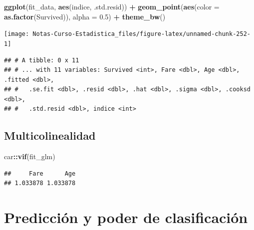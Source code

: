 \documentclass[
  12pt,
]{book}
\newenvironment{Shaded}{\begin{snugshade}}{\end{snugshade}}
\newcommand{\DataTypeTok}[1]{\textcolor[rgb]{0.13,0.29,0.53}{#1}}
\newcommand{\DecValTok}[1]{\textcolor[rgb]{0.00,0.00,0.81}{#1}}
\newcommand{\FloatTok}[1]{\textcolor[rgb]{0.00,0.00,0.81}{#1}}
\newcommand{\KeywordTok}[1]{\textcolor[rgb]{0.13,0.29,0.53}{\textbf{#1}}}
\newcommand{\NormalTok}[1]{#1}
\newcommand{\OperatorTok}[1]{\textcolor[rgb]{0.81,0.36,0.00}{\textbf{#1}}}
\newcommand{\StringTok}[1]{\textcolor[rgb]{0.31,0.60,0.02}{#1}}
\theoremstyle{definition}
\theoremstyle{definition}
\theoremstyle{definition}
\theoremstyle{remark}
\begin{document}
\begin{Shaded}
\begin{Highlighting}[]
\KeywordTok{ggplot}\NormalTok{(fit_data, }\KeywordTok{aes}\NormalTok{(indice, .std.resid)) }\OperatorTok{+}\StringTok{ }\KeywordTok{geom_point}\NormalTok{(}\KeywordTok{aes}\NormalTok{(}\DataTypeTok{color =} \KeywordTok{as.factor}\NormalTok{(Survived)), }
    \DataTypeTok{alpha =} \FloatTok{0.5}\NormalTok{) }\OperatorTok{+}\StringTok{ }\KeywordTok{theme_bw}\NormalTok{()}
\end{Highlighting}
\end{Shaded}

\begin{center}\texttt{[image: Notas-Curso-Estadistica\_files/figure-latex/unnamed-chunk-252-1]} \end{center}

\begin{Shaded}
\end{Shaded}

\begin{verbatim}
## # A tibble: 0 x 11
## # ... with 11 variables: Survived <int>, Fare <dbl>, Age <dbl>, .fitted <dbl>,
## #   .se.fit <dbl>, .resid <dbl>, .hat <dbl>, .sigma <dbl>, .cooksd <dbl>,
## #   .std.resid <dbl>, indice <int>
\end{verbatim}

\hypertarget{multicolinealidad-1}{%
\subsection{Multicolinealidad}\label{multicolinealidad-1}}

\begin{Shaded}
\begin{Highlighting}[]
\NormalTok{car}\OperatorTok{::}\KeywordTok{vif}\NormalTok{(fit_glm)}
\end{Highlighting}
\end{Shaded}

\begin{verbatim}
##     Fare      Age 
## 1.033878 1.033878
\end{verbatim}

\hypertarget{predicciuxf3n-y-poder-de-clasificaciuxf3n}{%
\section{Predicción y poder de clasificación}\label{predicciuxf3n-y-poder-de-clasificaciuxf3n}}
\end{document}
